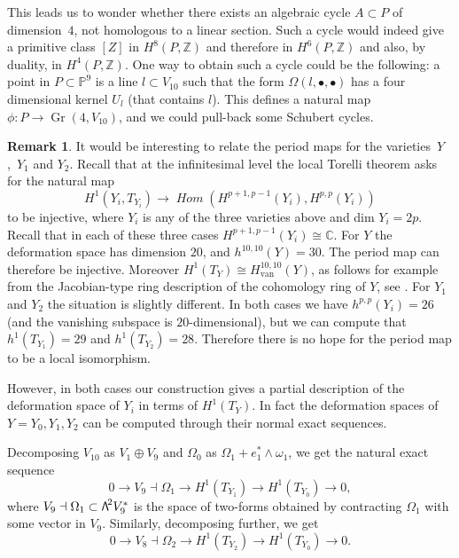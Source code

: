 \documentclass[11pt]{article}
\newcommand{\sbullet}{{\scriptstyle\bullet}}
\newcommand\bw[1]{{\hbox{\large$\mathsf{\Lambda}$}^{\!#1}}}
\newcommand{\van}{\mathrm{van}}
\DeclareMathOperator{\iHom}{\mathit{Hom}}
\theoremstyle{plain}
\theoremstyle{definition}
\newtheorem{remark}[theorem]{Remark}
\DeclareMathOperator{\Gr}{Gr}
\newcommand{\ZZ}{\mathbb{Z}}
\newcommand{\CC}{\mathbb{C}}
\newcommand{\PP}{\mathbb{P}}
\begin{document}
This leads us to wonder whether there exists an algebraic cycle $A \subset P$ of dimension~$4$, not homologous to a linear section. Such a cycle would indeed give a primitive class
$[Z]$ in $H^8(P,\ZZ)$ and therefore in $H^6(P,\ZZ)$ and also, by duality, in $H^4(P,\ZZ)$.
One way to obtain such a cycle could be the following: a point in $P \subset \PP^9$ is a line
$l \subset V_{10}$ such that the form $\Omega(l,\sbullet,\sbullet)$ has a four dimensional
kernel $U_l$ (that contains $l$). This defines a natural map $\phi: P \to \Gr(4,V_{10})$,
and we could pull-back some Schubert cycles.

\begin{remark}
It would be interesting to relate the period maps for the varieties~$Y$,~$Y_1$ and $Y_2$.
Recall that at the infinitesimal level the local Torelli theorem asks for the natural map\vspace*{-3pt}
\[
 H^1(Y_i, T_{Y_i}) \to \iHom(H^{p+1, p-1}(Y_i), H^{p,p}(Y_i))
\]
to be injective, where $Y_i$ is any of the three varieties above and dim $Y_i=2p$. Recall that in each of these three cases $H^{p+1, p-1}(Y_i) \cong \CC$. For $Y$ the deformation space has dimension $20$, and $h^{10,10}(Y)=30$. The period map can therefore be injective. Moreover $H^1(T_Y) \cong H^{10,10}_{\van}(Y)$, as follows for example from the Jacobian-type ring description of the cohomology ring of $Y$, see \cite{eg2}. For $Y_1$ and $Y_2$ the situation is slightly different. In both cases we have $h^{p,p}(Y_i)=26$ (and the vanishing subspace is $20$-dimensional), but we can compute that $h^1(T_{Y_1})=29$ and $h^1(T_{Y_2})=28$. Therefore there is no hope for the period map to be a local isomorphism.

However, in both cases our construction gives a partial description of the deformation space of $Y_i$ in terms of $H^1(T_Y)$.
In fact the deformation spaces of $Y=Y_0, Y_1, Y_2$ can be computed through their normal
exact sequences.

Decomposing $V_{10}$ as $V_1\oplus V_9$ and $\Omega_0$ as $\Omega_1+e_1^*\wedge\omega_1$,
we get the natural exact sequence\vspace*{-3pt}
\[
0\to V_9\dashv\Omega_1\to H^1(T_{Y_1})\to H^1(T_{Y_0})\to 0,
\]
where $V_9\dashv\Omega_1\subset \bw2V_{9}^*$ is the space of two-forms obtained by contracting
$\Omega_1$ with some vector in $V_9$.
Similarly, decomposing further, we get\vspace*{-3pt}
\[
0\to V_8\dashv\Omega_2\to H^1(T_{Y_2})\to H^1(T_{Y_0})\to 0.
\]
\end{remark}
\end{document}
